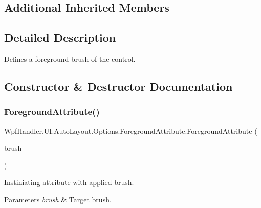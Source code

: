 \subsection*{Additional Inherited Members}


\subsection{Detailed Description}
Defines a foreground brush of the control. 



\subsection{Constructor \& Destructor Documentation}
\mbox{\label{class_wpf_handler_1_1_u_i_1_1_auto_layout_1_1_options_1_1_foreground_attribute_abae0ce13aea7130e5e9c72c208443380}} 
\subsubsection{\texorpdfstring{Foreground\+Attribute()}{ForegroundAttribute()}\hspace{0.1cm}{\footnotesize\ttfamily [1/4]}}
{\footnotesize\ttfamily Wpf\+Handler.\+U\+I.\+Auto\+Layout.\+Options.\+Foreground\+Attribute.\+Foreground\+Attribute (\begin{DoxyParamCaption}\item[{\mbox{\hyperlink{class_wpf_handler_1_1_u_i_1_1_color_attribute_afa14c4542d8023b3ddad6aba74993877}{Brush}}}]{brush }\end{DoxyParamCaption})}



Instiniating attribute with applied brush. 


\begin{DoxyParams}{Parameters}
{\em brush} & Target brush.\\
\hline
\end{DoxyParams}



